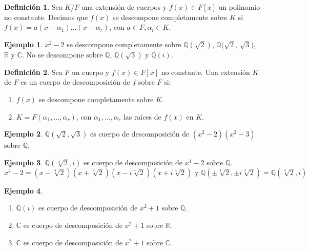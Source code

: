 \documentclass{report}
\theoremstyle{remark}
\theoremstyle{definition}
\newtheorem{definition}{Definición}[chapter]
\theoremstyle{definition}
\theoremstyle{definition}
\newtheorem*{example}{Ejemplo}
\begin{document}
\begin{definition}
    Sea $K/F$ una extensión de cuerpos y $f(x) \in F[x]$ un polinomio no constante.
    Decimos que $f(x)$ se descompone completamente sobre $K$ si $f(x) = a(x-\alpha_1) \dots (x-\alpha_r)$, con $a \in F, \alpha_i \in K$.
\end{definition}

\begin{example}
    $x^2 - 2$ se descompone completamente sobre $\mathbb{Q}(\sqrt{2})$, $\mathbb{Q}(\sqrt{2}$, $\sqrt{3})$, $\mathbb{R}$ y $\mathbb{C}$.
    No se descompone sobre $\mathbb{Q}$, $\mathbb{Q}(\sqrt{3})$ y $\mathbb{Q}(i)$.
\end{example}

\begin{definition}
    Sea $F$ un cuerpo y $f(x) \in F[x]$ no constante. Una extensión $K$ de $F$ es un cuerpo de descomposición de $f$ sobre $F$ si:
    \begin{enumerate}
        \item $f(x)$ se descompone completamente sobre $K$.
        \item $K = F(\alpha_1, \dots, \alpha_r)$, con $\alpha_1, \dots, \alpha_r$ las raíces de $f(x)$ en $K$.
    \end{enumerate}
\end{definition}

\begin{example}
    $\mathbb{Q}(\sqrt{2}, \sqrt{3})$ es cuerpo de descomposición de $(x^2-2)(x^2-3)$ sobre $\mathbb{Q}$.
\end{example}

\begin{example}
    $\mathbb{Q}(\sqrt[4]{2}, i)$ es cuerpo de descomposición de $x^4-2$ sobre $\mathbb{Q}$.
    $$x^4-2 = (x - \sqrt[4]{2})(x + \sqrt[4]{2})(x - i\sqrt[4]{2})(x + i\sqrt[4]{2}) \text{ y } \mathbb{Q}(\pm \sqrt[4]{2}, \pm i\sqrt[4]{2}) = \mathbb{Q}(\sqrt[4]{2}, i)$$
\end{example}

\begin{example}
    \begin{enumerate}
        \item $\mathbb{Q}(i)$ es cuerpo de descomposición de $x^2+1$ sobre $\mathbb{Q}$.
        \item $\mathbb{C}$ es cuerpo de descomposición de $x^2+1$ sobre $\mathbb{R}$.
        \item $\mathbb{C}$ es cuerpo de descomposición de $x^2+1$ sobre $\mathbb{C}$.
    \end{enumerate}
\end{example}
\end{document}
